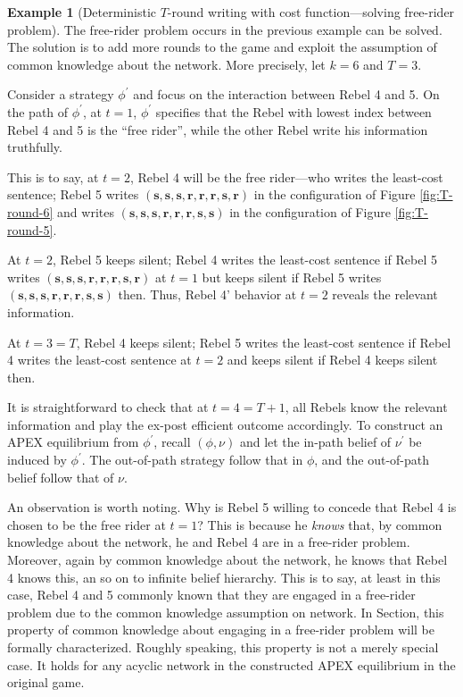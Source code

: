 \documentclass[12pt,letter]{article}
\theoremstyle{definition}
\newtheorem{example}{Example}
\theoremstyle{remark}
\theoremstyle{claim}
\begin{document}
\begin{example}[Deterministic $T$-round writing with cost function---solving free-rider problem]
\label{ex:cost_function_talk_solve_fr}
The free-rider problem occurs in the previous example can be solved. The solution is to add more rounds to the game and exploit the assumption of common knowledge about the network. More precisely, let $k=6$ and $T=3$. 

Consider a strategy $\phi^{'}$ and focus on the interaction between Rebel 4 and 5. On the path of $\phi^{'}$, at $t=1$, $\phi^{'}$ specifies that the Rebel with lowest index between Rebel 4 and 5 is the ``free rider'', while the other Rebel write his information truthfully. 

This is to say, at $t=2$, Rebel 4 will be the free rider---who writes the least-cost sentence; Rebel 5 writes $(\textbf{s},\textbf{s},\textbf{s},\textbf{r},\textbf{r},\textbf{r},\textbf{s},\textbf{r})$ in the configuration of Figure \ref{fig:T-round-6} and writes $(\textbf{s},\textbf{s},\textbf{s},\textbf{r},\textbf{r},\textbf{r},\textbf{s},\textbf{s})$ in the configuration of Figure \ref{fig:T-round-5}. 

At $t=2$, Rebel 5 keeps silent; Rebel 4 writes the least-cost sentence if Rebel 5 writes $(\textbf{s},\textbf{s},\textbf{s},\textbf{r},\textbf{r},\textbf{r},\textbf{s},\textbf{r})$ at $t=1$ but keeps silent if Rebel 5 writes $(\textbf{s},\textbf{s},\textbf{s},\textbf{r},\textbf{r},\textbf{r},\textbf{s},\textbf{s})$ then. Thus, Rebel 4' behavior at $t=2$ reveals the relevant information. 

At $t=3=T$, Rebel 4 keeps silent; Rebel 5 writes the least-cost sentence if Rebel 4 writes the least-cost sentence at $t=2$ and keeps silent if Rebel 4 keeps silent then. 

It is straightforward to check that at $t=4=T+1$, all Rebels know the relevant information and play the ex-post efficient outcome accordingly. To construct an APEX equilibrium from $\phi^{'}$, recall $(\phi,\nu)$ and let the in-path belief of $\nu^{'}$ be induced by $\phi^{'}$. The out-of-path strategy follow that in $\phi$, and the out-of-path belief follow that of $\nu$.   

An observation is worth noting. Why is Rebel 5 willing to concede that Rebel 4 is chosen to be the free rider at $t=1$? This is because he \textit{knows} that, by common knowledge about the network, he and Rebel 4 are in a free-rider problem. Moreover, again by common knowledge about the network, he knows that Rebel 4 knows this, an so on to infinite belief hierarchy. This is to say, at least in this case, Rebel 4 and 5 commonly known that they are engaged in a free-rider problem due to the common knowledge assumption on network. In Section, this property of common knowledge about engaging in a free-rider problem will be formally characterized. Roughly speaking, this property is not a merely special case. It holds for any acyclic network in the constructed APEX equilibrium in the original game.  


\end{example}
\end{document}
